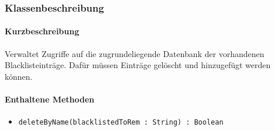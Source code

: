 \subsubsection*{Klassenbeschreibung}%
\paragraph*{Kurzbeschreibung}
Verwaltet Zugriffe auf die zugrundeliegende Datenbank der vorhandenen Blacklisteinträge.
Dafür müssen Einträge gelöscht und hinzugefügt werden können.
\paragraph*{Enthaltene Methoden}
\begin{itemize}
    \item \texttt{deleteByName(blacklistedToRem : String) : Boolean}
\end{itemize}
